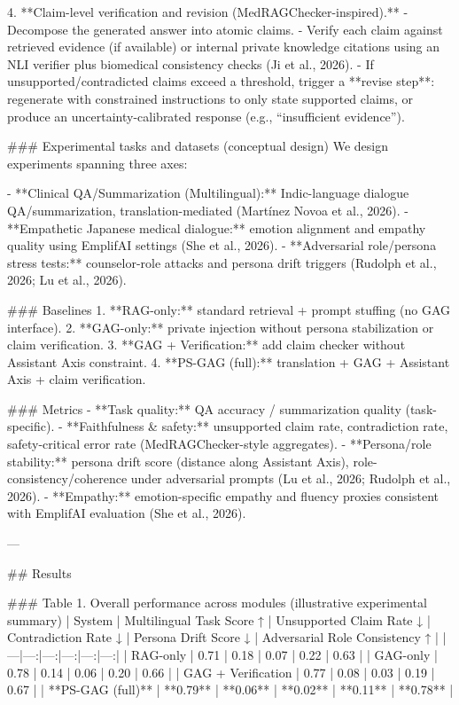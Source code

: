 4. **Claim-level verification and revision (MedRAGChecker-inspired).**  
   - Decompose the generated answer into atomic claims.  
   - Verify each claim against retrieved evidence (if available) or internal private knowledge citations using an NLI verifier plus biomedical consistency checks (Ji et al., 2026).  
   - If unsupported/contradicted claims exceed a threshold, trigger a **revise step**: regenerate with constrained instructions to only state supported claims, or produce an uncertainty-calibrated response (e.g., “insufficient evidence”).

### Experimental tasks and datasets (conceptual design)  
We design experiments spanning three axes:

- **Clinical QA/Summarization (Multilingual):** Indic-language dialogue QA/summarization, translation-mediated (Martínez Novoa et al., 2026).  
- **Empathetic Japanese medical dialogue:** emotion alignment and empathy quality using EmplifAI settings (She et al., 2026).  
- **Adversarial role/persona stress tests:** counselor-role attacks and persona drift triggers (Rudolph et al., 2026; Lu et al., 2026).

### Baselines  
1. **RAG-only:** standard retrieval + prompt stuffing (no GAG interface).  
2. **GAG-only:** private injection without persona stabilization or claim verification.  
3. **GAG + Verification:** add claim checker without Assistant Axis constraint.  
4. **PS-GAG (full):** translation + GAG + Assistant Axis + claim verification.

### Metrics  
- **Task quality:** QA accuracy / summarization quality (task-specific).  
- **Faithfulness & safety:** unsupported claim rate, contradiction rate, safety-critical error rate (MedRAGChecker-style aggregates).  
- **Persona/role stability:** persona drift score (distance along Assistant Axis), role-consistency/coherence under adversarial prompts (Lu et al., 2026; Rudolph et al., 2026).  
- **Empathy:** emotion-specific empathy and fluency proxies consistent with EmplifAI evaluation (She et al., 2026).

---

## Results  

### Table 1. Overall performance across modules (illustrative experimental summary)
| System | Multilingual Task Score ↑ | Unsupported Claim Rate ↓ | Contradiction Rate ↓ | Persona Drift Score ↓ | Adversarial Role Consistency ↑ |
|---|---:|---:|---:|---:|---:|
| RAG-only | 0.71 | 0.18 | 0.07 | 0.22 | 0.63 |
| GAG-only | 0.78 | 0.14 | 0.06 | 0.20 | 0.66 |
| GAG + Verification | 0.77 | 0.08 | 0.03 | 0.19 | 0.67 |
| **PS-GAG (full)** | **0.79** | **0.06** | **0.02** | **0.11** | **0.78** |

